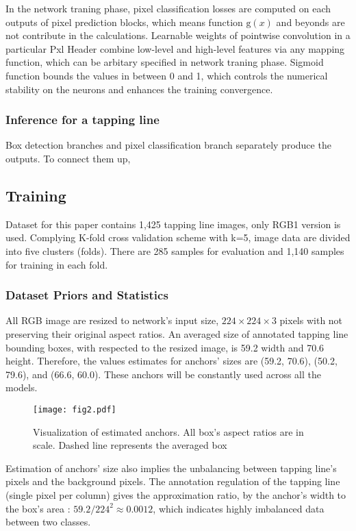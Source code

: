 \documentclass[default,pdflatex,iicol]{sn-jnl}%
\begin{document}
In the network traning phase, pixel classification losses are computed on each outputs of pixel prediction blocks, which means function $\mathrm{g}(x)$ and beyonds are not contribute in the calculations. Learnable weights of pointwise convolution in a particular Pxl Header combine low-level and high-level features via any mapping function, which can be arbitary specified in network traning phase. Sigmoid function bounds the values in between 0 and 1, which controls the numerical stability on the neurons and enhances the training convergence.

\subsubsection{Inference for a tapping line}
Box detection branches and pixel classification branch separately produce the outputs. To connect them up, 




\subsection{Training}
Dataset for this paper contains 1,425 tapping line images, only RGB1 version \cite{Wongtanawijit_2021} is used. Complying K-fold cross validation scheme with k=5, image data are divided into five clusters (folds). There are 285 samples for evaluation and 1,140 samples for training in each fold.

\subsubsection{Dataset Priors and Statistics}
All RGB image are resized to network's input size, $224\times224\times3$ pixels with not preserving their original aspect ratios. An averaged size of annotated tapping line bounding boxes, with respected to the resized image, is 59.2 width and 70.6 height. Therefore, the values estimates for anchors' sizes are (59.2, 70.6), (50.2, 79.6), and (66.6, 60.0). These anchors will be constantly used across all the models.

\begin{figure}[h]%
\centering
\texttt{[image: fig2.pdf]}
\caption{Visualization of estimated anchors. All box's aspect ratios are in scale. Dashed line represents the averaged box}\label{fig2-anchors}
\end{figure}

Estimation of anchors' size also implies the unbalancing between tapping line's pixels and the background pixels. The annotation regulation of the tapping line (single pixel per column) gives the approximation ratio, by the anchor's width to the box's area : $59.2 / 224^2 \approx 0.0012$, which indicates highly imbalanced data between two classes.
\end{document}
